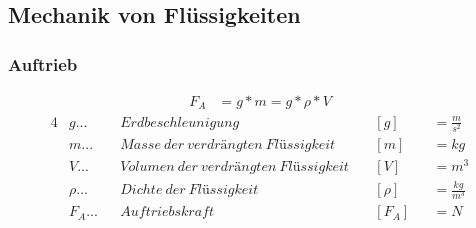 \documentclass[12pt]{article}
\begin{document}
		\subsection{Mechanik von Flüssigkeiten}
			\subsubsection{Auftrieb}
				\begin{align*}
					F_A &= g * m = g * \rho * V
				\end{align*}
				\begin{alignat*}{4}
					&g   ...&&Erdbeschleunigung                      &&\ [g]    &&= \frac{m}{s^2} \\
					&m   ...&&Masse\ der\ verdrängten\ Flüssigkeit   &&\ [m]    &&= kg \\
					&V   ...&&Volumen\ der\ verdrängten\ Flüssigkeit &&\ [V]    &&= m^3 \\
					&\rho...&&Dichte\ der\ Flüssigkeit               &&\ [\rho] &&= \frac{kg}{m^3}\\
					&F_A ...&&Auftriebskraft                         &&\ [F_A]  &&= N \\
				\end{alignat*}
				
\end{document}
